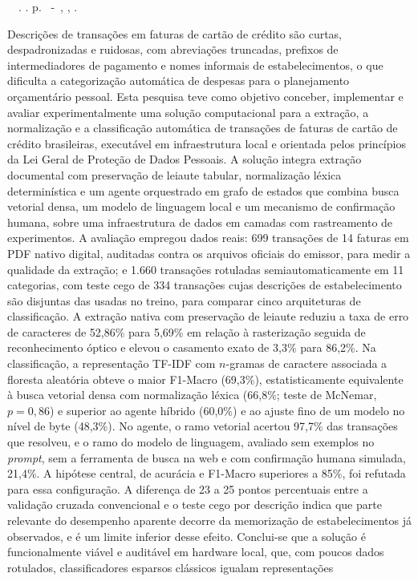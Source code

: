 \setlength{\absparsep}{18pt} %
\begin{resumo}
	\begin{flushleft}
			\setlength{\absparsep}{0pt} %
			\SingleSpacing
			\imprimirautorabr~~\textbf{\imprimirtituloresumo}.	\imprimirdata. \pageref{LastPage} p.
			\imprimirtipotrabalho~-~\imprimirinstituicao, \imprimirlocal, \imprimirdata.
 	\end{flushleft}
\OnehalfSpacing
 Descrições de transações em faturas de cartão de crédito são curtas, despadronizadas e ruidosas, com abreviações truncadas, prefixos de intermediadores de pagamento e nomes informais de estabelecimentos, o que dificulta a categorização automática de despesas para o planejamento orçamentário pessoal. Esta pesquisa teve como objetivo conceber, implementar e avaliar experimentalmente uma solução computacional para a extração, a normalização e a classificação automática de transações de faturas de cartão de crédito brasileiras, executável em infraestrutura local e orientada pelos princípios da Lei Geral de Proteção de Dados Pessoais. A solução integra extração documental com preservação de leiaute tabular, normalização léxica determinística e um agente orquestrado em grafo de estados que combina busca vetorial densa, um modelo de linguagem local e um mecanismo de confirmação humana, sobre uma infraestrutura de dados em camadas com rastreamento de experimentos. A avaliação empregou dados reais: 699 transações de 14 faturas em PDF nativo digital, auditadas contra os arquivos oficiais do emissor, para medir a qualidade da extração; e 1.660 transações rotuladas semiautomaticamente em 11 categorias, com teste cego de 334 transações cujas descrições de estabelecimento são disjuntas das usadas no treino, para comparar cinco arquiteturas de classificação. A extração nativa com preservação de leiaute reduziu a taxa de erro de caracteres de 52,86\% para 5,69\% em relação à rasterização seguida de reconhecimento óptico e elevou o casamento exato de 3,3\% para 86,2\%. Na classificação, a representação TF-IDF com $n$-gramas de caractere associada a floresta aleatória obteve o maior F1-Macro (69,3\%), estatisticamente equivalente à busca vetorial densa com normalização léxica (66,8\%; teste de McNemar, $p = 0{,}86$) e superior ao agente híbrido (60,0\%) e ao ajuste fino de um modelo no nível de byte (48,3\%). No agente, o ramo vetorial acertou 97,7\% das transações que resolveu, e o ramo do modelo de linguagem, avaliado sem exemplos no \textit{prompt}, sem a ferramenta de busca na web e com confirmação humana simulada, 21,4\%. A hipótese central, de acurácia e F1-Macro superiores a 85\%, foi refutada para essa configuração. A diferença de 23 a 25 pontos percentuais entre a validação cruzada convencional e o teste cego por descrição indica que parte relevante do desempenho aparente decorre da memorização de estabelecimentos já observados, e é um limite inferior desse efeito. Conclui-se que a solução é funcionalmente viável e auditável em hardware local, que, com poucos dados rotulados, classificadores esparsos clássicos igualam representações 
\end{resumo}
